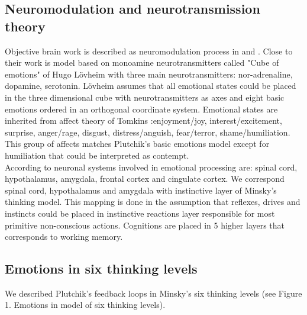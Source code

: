 \subsection{Neuromodulation and neurotransmission theory}

Objective brain work is described as neuromodulation process in \cite{neuromodulatory} and \cite{emotionsbraintorobot}.
Close to their work is model based on monoamine neurotransmitters called "Cube of emotions" of Hugo L\"{o}vheim\cite{cubeofemotions} with three main neurotransmitters: nor-adrenaline, dopamine, serotonin. L\"{o}vheim assumes that all emotional states could be placed in the three dimensional cube with neurotransmitters as axes and eight basic emotions ordered in an orthogonal coordinate system. Emotional states are inherited from affect theory of Tomkins \cite{tomkins1, tomkins2, tomkins3}:enjoyment/joy, interest/excitement, surprise, anger/rage, disgust, distress/anguish, fear/terror, shame/humiliation. This group of affects matches  Plutchik's basic emotions model except for humiliation that could be interpreted as contempt.\\
According to \cite{emotionsbraintorobot} neuronal systems involved in emotional processing are: spinal cord, hypothalamus, amygdala, frontal cortex and cingulate cortex. We correspond spinal cord, hypothalamus and amygdala with instinctive layer of Minsky's thinking model. This mapping is done in the assumption that reflexes, drives and instincts could be placed in instinctive reactions layer responsible for most primitive non-conscious actions. Cognitions are placed in 5 higher layers that corresponds to working memory.

\subsection{Emotions in six thinking levels}

We described Plutchik's feedback loops\cite{natureofemotions} in Minsky's six thinking levels (see Figure 1. Emotions in model of six thinking levels).

